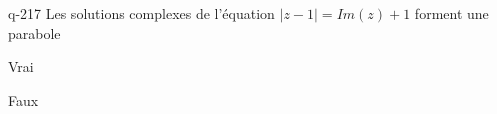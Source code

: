 \begin{truefalse}{q-217}
Les solutions complexes de l'équation $|z-1|=Im(z)+1$ forment une parabole
\item* Vrai
\item Faux
\end{truefalse}

